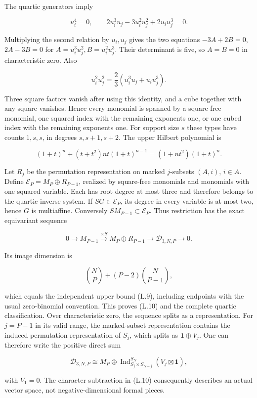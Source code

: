 The quartic generators imply

\[
u_i^4=0,\qquad2u_i^3u_j-3u_i^2u_j^2+2u_iu_j^3=0.
\tag{L.7}
\]

Multiplying the second relation by \(u_i,u_j\) gives the two equations \(-3A+2B=0\), \(2A-3B=0\) for \(A=u_i^3u_j^2,B=u_i^2u_j^3\). Their determinant is five, so \(A=B=0\) in characteristic zero. Also

\[
u_i^2u_j^2=\frac23(u_i^3u_j+u_iu_j^3).
\tag{L.8}
\]

Three square factors vanish after using this identity, and a cube together with any square vanishes. Hence every monomial is spanned by a square-free monomial, one squared index with the remaining exponents one, or one cubed index with the remaining exponents one. For support size \(s\) these types have counts \(1,s,s\), in degrees \(s,s+1,s+2\). The upper Hilbert polynomial is

\[
(1+t)^n+(t+t^2)nt(1+t)^{n-1}=(1+nt^2)(1+t)^n.
\tag{L.9}
\]

Let \(R_j\) be the permutation representation on marked \(j\)-subsets \((A,i)\), \(i\in A\). Define \(\mathcal E_P=M_P\oplus R_{P-1}\), realized by square-free monomials and monomials with one squared variable. Each has root degree at most three and therefore belongs to the quartic inverse system. If \(SG\in\mathcal E_P\), its degree in every variable is at most two, hence \(G\) is multiaffine. Conversely \(SM_{P-1}\subset\mathcal E_P\). Thus restriction has the exact equivariant sequence

\[
0\longrightarrow M_{P-1}\xrightarrow{\times S}
M_P\oplus R_{P-1}\longrightarrow\mathscr D_{3,N,P}\longrightarrow0.
\tag{L.10}
\]

Its image dimension is

\[
\binom NP+(P-2)\binom N{P-1},
\tag{L.11}
\]

which equals the independent upper bound (L.9), including endpoints with the usual zero-binomial convention. This proves (L.10) and the complete quartic classification. Over characteristic zero, the sequence splits as a representation. For \(j=P-1\) in its valid range, the marked-subset representation contains the induced permutation representation of \(S_j\), which splits as \(\mathbf1\oplus V_j\). One can therefore write the positive direct sum

\[
\mathscr D_{3,N,P}\cong M_P\oplus
\operatorname{Ind}_{S_j\times S_{N-j}}^{S_N}(V_j\boxtimes\mathbf1),
\tag{L.12}
\]

with \(V_1=0\). The character subtraction in (L.10) consequently describes an actual vector space, not negative-dimensional formal pieces.

